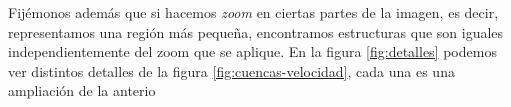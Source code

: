 Fijémonos además que si hacemos \textit{zoom} en ciertas partes de la imagen, es decir, representamos una región más pequeña, encontramos estructuras que son iguales independientemente del zoom que se aplique. En la figura \ref{fig:detalles} podemos ver distintos detalles de la figura \ref{fig:cuencas-velocidad}, cada una es una ampliación de la anterio